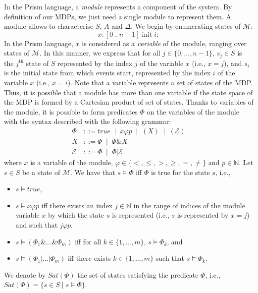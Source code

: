 In the Prism language, a \textit{module} represents a component of the system.
By definition of our MDPs, we just need a single module to
represent them. A module allows to characterise $S$, $A$ and $\Delta$. We begin by enumerating states of $\mathcal{M}$:
\[
  x: [0\, ..\, n-1] \; \text{init} \; i;
\]
In the Prism language, $x$ is considered as a \textit{variable} of the module, ranging over states of $\mathcal{M}$.
In this manner, we express that for all $j \in \{0, \dots, n-1\}$, $s_j \in S$
is the $j^{\text{th}}$ state of $S$ represented by the index $j$ of the variable $x$ (i.e., $x=j$), and $s_i$ is the initial state from which events start, represented by the index $i$ of the variable $x$ (i.e., $x=i$).
Note that a variable represents a set of states of the MDP. Thus, it is possible that a module has more than one variable if the state space of the MDP is formed by a Cartesian product of set of states.
Thanks to variables of the module, it is possible to form predicates $\Phi$ on the variables of the module with the syntax described with the following grammar:
\begin{align*}
  \Phi &::= true \; \mid \; x \varphi p \; \mid \; (X) \; \mid \; (\mathcal{E}) \\
  X &::= \Phi \; \mid \; \Phi \& X \\
  \mathcal{E} &::= \Phi \; \mid \; \Phi | \mathcal{E}
\end{align*}
where $x$ is a variable of the module, $\varphi \in \{<, \leq, >, \geq, =, \neq\}$
and $p \in \mathbb{N}$. Let $s \in S$ be a state of $\mathcal{M}$. We have that $s \models \Phi$ iff $\Phi$ is true for the state $s$, i.e.,
\begin{itemize}
  \item $s \models true$,
  \item $s \models x \varphi p$ iff there exists an index $j \in \mathbb{N}$ in the range of indices of the module variable $x$ by which the state $s$ is represented (i.e., $s$ is represented by $x=j$) and such that $j \varphi p$.
  \item $s \models (\Phi_1 \& \dots \& \Phi_m)$ iff
    for all $k \in \{1, \dots, m\}$, $s \models \Phi_k$, and
  \item $s \models (\Phi_1 | \dots | \Phi_m)$ iff
    there exists $k \in \{1, \dots, m\}$ such that $s \models \Phi_k$.
\end{itemize}
We denote by $Sat(\Phi)$ the set of states satisfying the predicate $\Phi$, i.e., $Sat(\Phi) = \{s \in S \; | \; s \models \Phi\}$.

